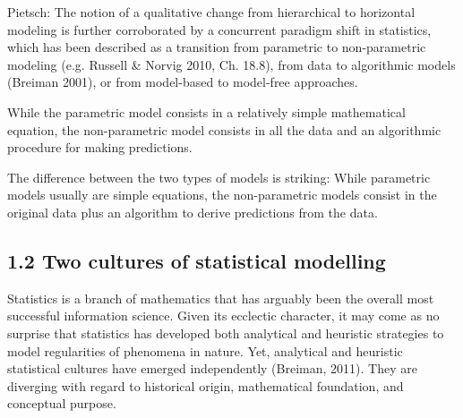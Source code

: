 \documentclass[authoryear,review,3p]{elsarticle}
\begin{document}
Pietsch:
The notion of a qualitative change from hierarchical to horizontal modeling is further corroborated by a concurrent paradigm shift in statistics, which has been described as a transition from parametric to non-parametric modeling (e.g. Russell & Norvig 2010, Ch. 18.8), from data to algorithmic models (Breiman 2001), or from model-based to model-free approaches. 

While the parametric model consists in a relatively simple mathematical equation, the non-parametric model consists in all the data and an algorithmic procedure for making predictions.

The difference between the two types of models is striking: While parametric models usually are simple equations, the non-parametric models consist in the original data plus an algorithm to derive predictions from the data.




\subsection*{1.2 Two cultures of statistical modelling}

Statistics is a branch of mathematics that has arguably been the
overall most successful information science.
%
Given its ecclectic character, it may come as no surprise that statistics
has developed both analytical and heuristic strategies
to model regularities of phenomena in nature.
Yet, analytical and heuristic statistical cultures
have emerged independently (Breiman, 2011).
They are diverging with regard to historical origin, mathematical foundation,
and conceptual purpose.
\end{document}
